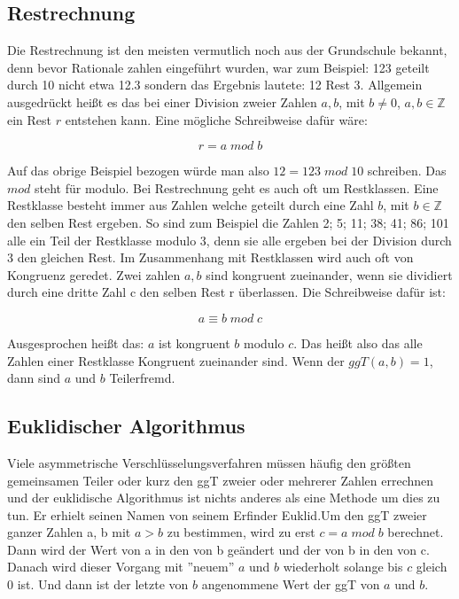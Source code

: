 \documentclass[a4paper,12pt,titlepage]{article}
\begin{document}
\subsection{Restrechnung}
Die Restrechnung ist den meisten vermutlich noch aus der Grundschule bekannt, denn bevor Rationale zahlen eingeführt wurden, war zum Beispiel: 123 geteilt durch 10 nicht etwa 12.3 sondern das Ergebnis lautete: 12 Rest 3. Allgemein ausgedrückt heißt es das bei einer Division zweier Zahlen $a,b$, mit $b \neq 0$, $a,b \in \mathbb{Z}$ ein Rest $r$ entstehen kann. Eine mögliche Schreibweise dafür wäre: \newline
\begin{center}
\[r = a \; mod \; b\]
\end{center}
Auf das obrige Beispiel bezogen würde man also $12 = 123 \; mod \; 10$ schreiben. Das $mod$ steht für modulo. \newline Bei Restrechnung geht es auch oft um Restklassen. Eine Restklasse besteht immer aus Zahlen welche geteilt durch eine Zahl $b$, mit $b \in \mathbb{Z}$ den selben Rest ergeben. So sind zum Beispiel die Zahlen 2; 5; 11; 38; 41; 86; 101 alle ein Teil der Restklasse modulo 3, denn sie alle ergeben bei der Division durch 3 den gleichen Rest. Im Zusammenhang mit Restklassen wird auch oft von Kongruenz geredet. Zwei zahlen $a, b$ sind kongruent zueinander, wenn sie dividiert durch eine dritte Zahl c den selben Rest r überlassen. Die Schreibweise dafür ist: \newline
 \begin{center}
\[a \equiv b \; mod \; c\]
 \end{center}
Ausgesprochen heißt das: $a$ ist kongruent $b$ modulo $c$.
Das heißt also das alle Zahlen einer Restklasse Kongruent zueinander sind.
Wenn der $ggT(a, b) = 1$, dann sind $a$ und $b$ Teilerfremd.

\subsection{Euklidischer Algorithmus}
Viele asymmetrische Verschlüsselungsverfahren müssen häufig den größten gemeinsamen Teiler oder kurz den ggT zweier oder mehrerer Zahlen errechnen und der euklidische Algorithmus ist nichts anderes als eine Methode um dies zu tun. Er erhielt seinen Namen von seinem Erfinder Euklid.\newline Um den ggT zweier ganzer Zahlen a, b mit $a > b$ zu bestimmen, wird zu erst $c = a \; mod \; b$ berechnet. Dann wird der Wert von a in den von b geändert und der von b in den von c. Danach wird dieser Vorgang mit ''neuem'' $a$ und $b$ wiederholt solange bis $c$ gleich 0 ist. Und dann ist der letzte von $b$ angenommene Wert der ggT von $a$ und $b$.
\end{document}
